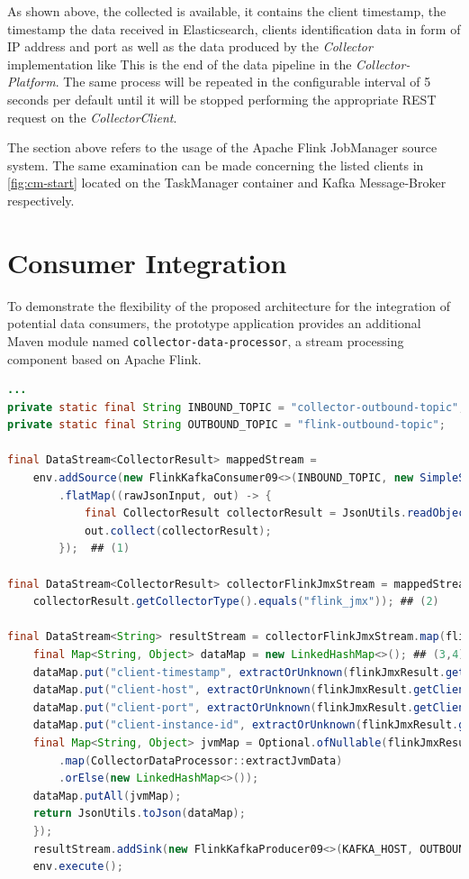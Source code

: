 As shown above, the collected is available, it contains the client timestamp, the timestamp the data received in Elasticsearch, clients
identification data in form of IP address and port as well as the data produced by the \textit{Collector} implementation like
This is the end of the data pipeline in the \textit{Collector-Platform}. The same process will be repeated in the configurable interval
of 5 seconds per default until it will be stopped performing the appropriate REST request on the \textit{CollectorClient}.

The section above refers to the usage of the Apache Flink JobManager source system. The same examination can be made concerning
the listed clients in \autoref{fig:cm-start} located on the TaskManager container and Kafka Message-Broker respectively.

\section{Consumer Integration}

To demonstrate the flexibility of the proposed architecture for the integration of potential data consumers, the prototype application
provides an additional Maven module named \verb|collector-data-processor|, a stream processing component based on Apache Flink.

\begin{lstlisting}[caption={Apache Flink raw data stream processor}, captionpos=b, label={lst:flink-processor},language=Java]
...
private static final String INBOUND_TOPIC = "collector-outbound-topic";
private static final String OUTBOUND_TOPIC = "flink-outbound-topic";

final DataStream<CollectorResult> mappedStream =
    env.addSource(new FlinkKafkaConsumer09<>(INBOUND_TOPIC, new SimpleStringSchema(), properties))
        .flatMap((rawJsonInput, out) -> {
            final CollectorResult collectorResult = JsonUtils.readObject(CollectorResult.class, rawJsonInput);
            out.collect(collectorResult);
        });  ## (1)

final DataStream<CollectorResult> collectorFlinkJmxStream = mappedStream.filter(collectorResult ->
    collectorResult.getCollectorType().equals("flink_jmx")); ## (2)

final DataStream<String> resultStream = collectorFlinkJmxStream.map(flinkJmxResult -> {
    final Map<String, Object> dataMap = new LinkedHashMap<>(); ## (3,4)
    dataMap.put("client-timestamp", extractOrUnknown(flinkJmxResult.getClientTimestamp()));
    dataMap.put("client-host", extractOrUnknown(flinkJmxResult.getClientHost()));
    dataMap.put("client-port", extractOrUnknown(flinkJmxResult.getClientPort()));
    dataMap.put("client-instance-id", extractOrUnknown(flinkJmxResult.getInstanceId()));
    final Map<String, Object> jvmMap = Optional.ofNullable(flinkJmxResult.getData())
        .map(CollectorDataProcessor::extractJvmData)
        .orElse(new LinkedHashMap<>());
    dataMap.putAll(jvmMap);
    return JsonUtils.toJson(dataMap);
    });
    resultStream.addSink(new FlinkKafkaProducer09<>(KAFKA_HOST, OUTBOUND_TOPIC, new SimpleStringSchema())); ## (5)
    env.execute();
\end{lstlisting}

